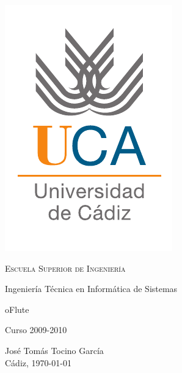 \documentclass[a4paper,12pt,titlepage,halfparskip,cleardoubleempty]{scrbook}
\begin{document}



\begin{titlepage}
  \centering
  \includegraphics[width=.3\textwidth]{logo_uca}

  \bigskip
  \bigskip
  \bigskip
  
  \begin{changemargin}{3em}{3em}
    \centering

    {\Huge \textsc{\nohyphens{Escuela Superior de Ingeniería}}}
    
    \bigskip
    \bigskip
    \bigskip

    {\huge \nohyphens{Ingeniería Técnica en Informática de Sistemas}}

    \bigskip
    \bigskip
    \bigskip
    \bigskip
    \bigskip
    \bigskip

    {\LARGE \nohyphens{oFlute}}

    \bigskip
    \bigskip
    \bigskip
    \bigskip

    {\large Curso 2009-2010}

    \bigskip
    \bigskip
    \bigskip
    \bigskip
    \bigskip
    \bigskip
    \bigskip
      
    \end{changemargin}

    {\Large José Tomás Tocino García \\}
    {\large Cádiz, \today}

\end{titlepage}
\end{document}
